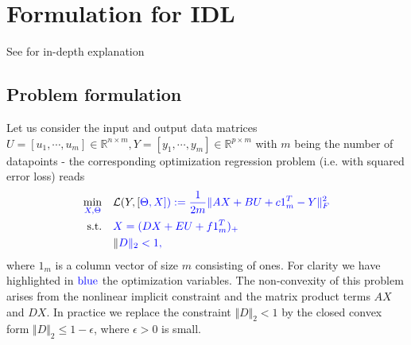 \documentclass[letterpaper,10pt,english]{sphinxmanual}
\begin{document}
\chapter{Formulation for IDL}
\label{\detokenize{sections/bi_convex_formulation:formulation-for-idl}}\label{\detokenize{sections/bi_convex_formulation:formulation}}\label{\detokenize{sections/bi_convex_formulation::doc}}
See {\hyperref[\detokenize{sections/citing:citing}]{}} for in-depth explanation


\section{Problem formulation}
\label{\detokenize{sections/bi_convex_formulation:problem-formulation}}
Let us consider the input and output data matrices \(U = [u_1, \cdots, u_m] \in \mathbb{R}^{n \times m},Y = [y_1, \cdots, y_m] \in \mathbb{R}^{p \times m}\)
with \(m\) being the number of datapoints - the corresponding optimization regression problem (i.e. with
squared error loss) reads
\begin{equation}\label{equation:sections/bi_convex_formulation:eq_2}
\begin{split}\begin{align}
    \min_{\color{blue}{X}, \color{blue}{\Theta}} \quad &\mathcal{L}(Y,[\color{blue}{\Theta},\color{blue}{X}]) := \frac{1}{2m} \Vert \color{blue}{AX} + \color{blue}{B}U + \color{blue}{c}1_m^T - Y \Vert_F^2 \\
    \text{s.t.} \quad &\color{blue}{X}=(\color{blue}{DX} + \color{blue}{E}U + \color{blue}{f}1_m^T)_+ \\
                \quad &\Vert \color{blue}{D} \Vert_2 < 1,
\end{align}\end{split}
\end{equation}
where \(1_m\) is a column vector of size \(m\) consisting of ones. For clarity we have highlighted in \(\color{blue}{\text{blue}}\) the optimization variables.
The non-convexity of this problem arises from the nonlinear implicit constraint and
the matrix product terms \(AX\) and \(DX\). In practice we replace the constraint \(\Vert D \Vert_2 < 1\)
by the closed convex form \(\Vert D \Vert_2 \leq 1 - \epsilon\), where \(\epsilon > 0\) is small.
\end{document}
